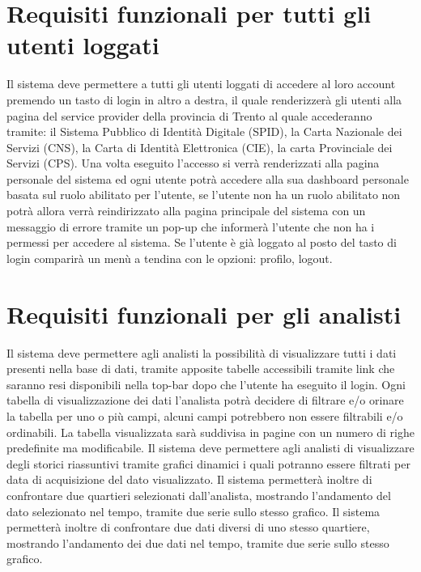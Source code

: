     \section{Requisiti funzionali per tutti gli utenti loggati}
        \begin{rfList}
            \rfItem Il sistema deve permettere a tutti gli utenti loggati di accedere al loro account premendo un tasto di login in altro a destra, il quale renderizzerà gli utenti alla pagina del service provider della provincia di Trento al quale accederanno tramite: il Sistema Pubblico di Identità Digitale (SPID), la Carta Nazionale dei Servizi (CNS), la Carta di Identità Elettronica (CIE), la carta Provinciale dei Servizi (CPS). Una volta eseguito l'accesso si verrà renderizzati alla pagina personale del sistema ed ogni utente potrà accedere alla sua dashboard personale basata sul ruolo abilitato per l'utente, se l'utente non ha un ruolo abilitato non potrà allora verrà reindirizzato alla pagina principale del sistema con un messaggio di errore tramite un pop-up che informerà l'utente che non ha i permessi per accedere al sistema. Se l'utente è già loggato al posto del tasto di login comparirà un menù a tendina con le opzioni: profilo, logout.
        \end{rfList}
    \section{Requisiti funzionali per gli analisti}
        \begin{rfList}
            \rfItem Il sistema deve permettere agli analisti la possibilità di visualizzare tutti i dati presenti nella base di dati, tramite apposite tabelle accessibili tramite link che saranno resi disponibili nella top-bar dopo che l'utente ha eseguito il login. Ogni tabella di visualizzazione dei dati l'analista potrà decidere di filtrare e/o orinare la tabella per uno o più campi, alcuni campi potrebbero non essere filtrabili e/o ordinabili. La tabella visualizzata sarà suddivisa in pagine con un numero di righe predefinite ma modificabile.
            \rfItem Il sistema deve permettere agli analisti di visualizzare degli storici riassuntivi tramite grafici dinamici i quali potranno essere filtrati per data di acquisizione del dato visualizzato. Il sistema permetterà inoltre di confrontare due quartieri selezionati dall'analista, mostrando l'andamento del dato selezionato nel tempo, tramite due serie sullo stesso grafico. Il sistema permetterà inoltre di confrontare due dati diversi di uno stesso quartiere, mostrando l'andamento dei due dati nel tempo, tramite due serie sullo stesso grafico. 
        \end{rfList}
